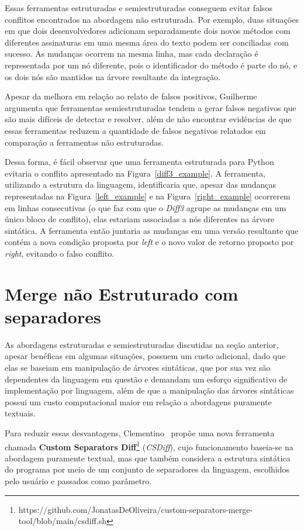Essas ferramentas estruturadas e semiestruturadas conseguem evitar falsos
conflitos encontrados na abordagem não estruturada. Por exemplo, duas situações
em que dois desenvolvedores adicionam separadamente dois novos métodos com
diferentes assinaturas em uma mesma área do texto podem ser conciliadas com
sucesso. As mudanças ocorrem na mesma linha, mas cada declaração é representada
por um nó diferente, pois o identificador do método é parte do nó, e os dois
nós são mantidos na árvore resultante da integração.

Apesar da melhora em relação ao relato de falsos positivos,
Guilherme~\cite{cavalcanti17} argumenta que ferramentas semiestruturadas tendem
a gerar falsos negativos que são mais difíceis de detectar e resolver, além de
não encontrar evidências de que essas ferramentas reduzem a quantidade de
falsos negativos relatados em comparação a ferramentas não estruturadas.

Dessa forma, é fácil observar que uma ferramenta estruturada para Python
evitaria o conflito apresentado na Figura~\ref{diff3_example}. A ferramenta,
utilizando a estrutura da linguagem, identificaria que, apesar das mudanças
representadas na Figura~\ref{left_example} e na Figura~\ref{right_example}
ocorrerem em linhas consecutivas (o que faz com que o \emph{Diff3} agrupe as
mudanças em um único bloco de conflito), elas estariam associadas a nós
diferentes na árvore sintática. A ferramenta então juntaria as mudanças em uma
versão resultante que contém a nova condição proposta por \emph{left} e o novo
valor de retorno proposto por \emph{right}, evitando o falso conflito.

\section{Merge não Estruturado com separadores}

As abordagens estruturadas e semiestruturadas discutidas na seção anterior,
apesar benéficas em algumas situações, possuem um custo adicional, dado que elas se
baseiam em manipulação de árvores sintáticas, que por sua vez são dependentes
da linguagem em questão e demandam um esforço significativo de implementação
por linguagem, além de que a manipulação das árvores sintáticas possui um custo
computacional maior em relação a abordagens puramente textuais.

Para reduzir essas desvantagens, Clementino~\cite{clem21} propôe uma nova
ferramenta chamada \textbf{Custom Separators
Diff}\footnote{https://github.com/JonatasDeOliveira/custom-separators-merge-tool/blob/main/csdiff.sh}
(\emph{CSDiff}), cujo funcionamento baseia-se na abordagem puramente textual,
mas que também considera a estrutura sintática do programa por meio de um
conjunto de separadores da linguagem, escolhidos pelo usuário e passados como
parâmetro.

